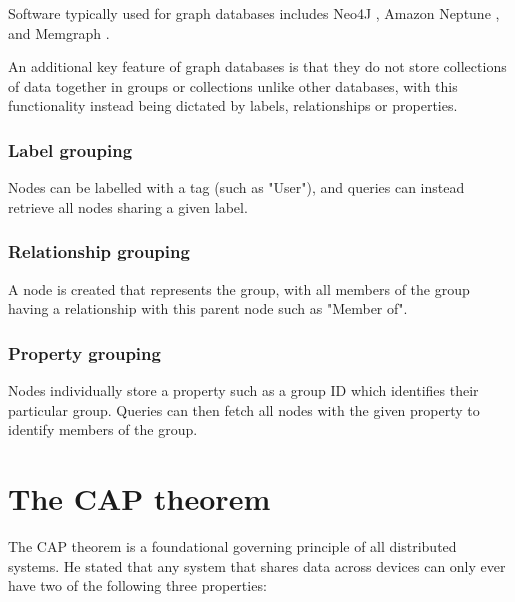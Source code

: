 \para Software typically used for graph databases includes Neo4J \autocite{neo4jNeo4jGraphDatabase2025}, Amazon 
Neptune \autocite{awsManagedGraphDatabase}, and Memgraph \autocite{memgraphMemgraphDatabase}.

\para An additional key feature of graph databases is that they do not store collections of data together in groups or collections 
unlike other databases, with this functionality instead being dictated by labels, relationships or properties. 

\subsubsection{Label grouping}
Nodes can be labelled with a tag (such as "User"), and queries can instead retrieve all nodes sharing a given label.

\subsubsection{Relationship grouping}
A node is created that represents the group, with all members of the group having a relationship with this parent node such as "Member of".

\subsubsection{Property grouping}
Nodes individually store a property such as a group ID which identifies their particular group. Queries can then fetch all nodes with the given 
property to identify members of the group.

\section{The CAP theorem}
The CAP theorem \autocite{brewerRobustDistributedSystems2000} is a foundational governing principle of all distributed systems. He stated that any 
system that shares data across devices can only ever have two of the following three properties:


